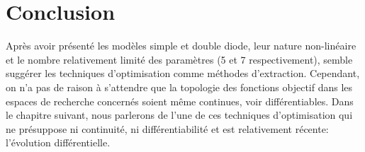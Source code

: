 \section{Conclusion}
Après avoir présenté les modèles simple et double diode, leur nature non-linéaire et le nombre relativement limité des paramètres (5 et 7 respectivement), semble suggérer les techniques d'optimisation comme méthodes d'extraction. Cependant, on n'a pas de raison à s'attendre que la topologie des fonctions objectif dans les espaces de recherche concernés soient même continues, voir différentiables. Dans le chapitre suivant, nous parlerons de l'une de ces techniques d'optimisation qui ne présuppose ni continuité, ni différentiabilité et est relativement récente: l'évolution différentielle.
